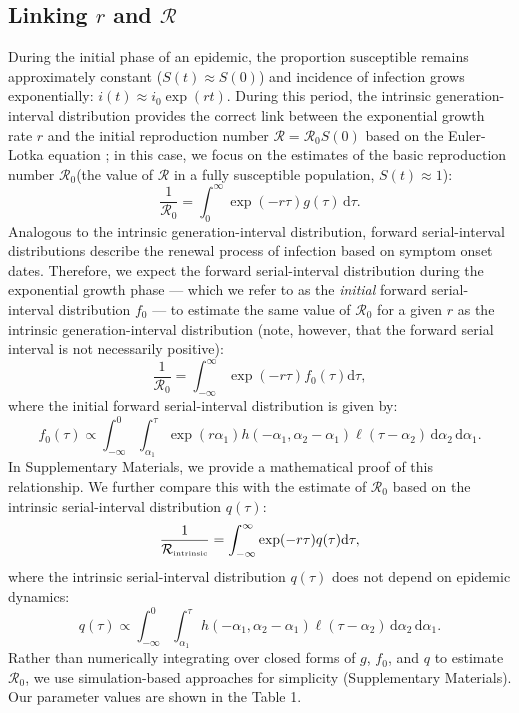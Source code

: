 \documentclass[12pt]{article}
\newcommand{\Rx}[1]{\ensuremath{{\mathcal R}_{#1}}\xspace}
\newcommand{\Ro}{\Rx{0}}
\newcommand{\RR}{\ensuremath{{\mathcal R}}\xspace}
\newcommand{\Rintrinsic}{\ensuremath{{\mathcal R}_{\textrm{\tiny intrinsic}}}\xspace}
\newcommand{\dd}[1]{\ensuremath{\, \mathrm{d}#1}}
\newcommand{\dtau}{\dd{\tau}}
\newcommand{\pinf}{\ensuremath{\alpha_1}} %
\newcommand{\sinf}{\ensuremath{\alpha_2}} %
\newcommand{\idist}{\ell} %
\begin{document}
\subsection{Linking $r$ and \RR}

During the initial phase of an epidemic, the proportion susceptible remains approximately constant ($S(t) \approx S(0)$) and incidence of infection grows exponentially: $i(t) \approx i_0\exp(rt)$.
During this period, the intrinsic generation-interval distribution provides the correct link between the exponential growth rate $r$ and the initial reproduction number $\RR=\Ro S(0)$ based on the Euler-Lotka equation \citep{wallinga2007generation};
in this case, we focus on the estimates of the basic reproduction number \Ro (the value of \RR in a fully susceptible population, $S(t) \approx 1$):
\begin{equation}
\frac{1}{\Ro} = \int_0^\infty \exp(-r\tau) g(\tau) \dtau.
\label{eq:Rgen}
\end{equation}
Analogous to the intrinsic generation-interval distribution, 
forward serial-interval distributions describe the renewal process of infection based on symptom onset dates.
Therefore, we expect the forward serial-interval distribution during the exponential growth phase --- which we refer to as the \emph{initial} forward serial-interval distribution $f_0$ --- to estimate the same value of \Ro for a given $r$ as the intrinsic generation-interval distribution (note, however, that the forward serial interval is not necessarily positive):
\begin{equation}
\frac{1}{\Ro} = \int_{-\infty}^\infty \exp(-r\tau) f_{0}(\tau) \mathrm{d} \tau,
\label{eq:Rforward}
\end{equation}
where the initial forward serial-interval distribution is given by:
\begin{equation}
f_{0}(\tau) \propto \int_{-\infty}^{0} \int_{\pinf}^{\tau} \exp(r \pinf) h(-\pinf, \sinf - \pinf) \idist(\tau - \sinf) \, \mathrm{d}\sinf\,\mathrm{d}\pinf.
\label{eq:initialSI}
\end{equation}
In Supplementary Materials, we provide a mathematical proof of this relationship.
We further compare this with the estimate of \Ro based on the intrinsic serial-interval distribution $q(\tau)$:
\begin{equation}
\frac{1}{\Rintrinsic} = \int_{-\infty}^\infty \exp(-r\tau) q(\tau) \mathrm{d} \tau,
\label{eq:Rintrinsic}
\end{equation}
where the intrinsic serial-interval distribution $q(\tau)$ does not depend on epidemic dynamics:
\begin{equation}
q(\tau) \propto \int_{-\infty}^{0} \int_{\pinf}^{\tau} h(-\pinf, \sinf - \pinf) \idist(\tau - \sinf) \, \mathrm{d}\sinf\,\mathrm{d}\pinf.
\label{eq:intrinsicSI}
\end{equation}
Rather than numerically integrating over closed forms of $g$, $f_0$, and $q$ to estimate $\Ro$, we use simulation-based approaches for simplicity (Supplementary Materials). Our parameter values are shown in the Table 1.
\end{document}

